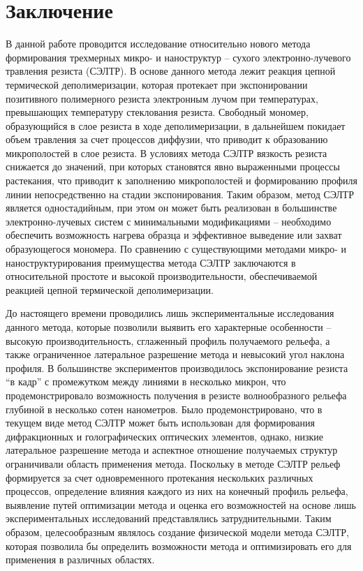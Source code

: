 \chapter*{Заключение}

В данной работе проводится исследование относительно нового метода формирования трехмерных микро- и наноструктур -- сухого электронно-лучевого травления резиста (СЭЛТР).
В основе данного метода лежит реакция цепной термической деполимеризации, которая протекает при экспонировании позитивного полимерного резиста электронным лучом при температурах, превышающих температуру стеклования резиста.
Свободный мономер, образующийся в слое резиста в ходе деполимеризации, в дальнейшем покидает объем травления за счет процессов диффузии, что приводит к образованию микрополостей в слое резиста.
В условиях метода СЭЛТР вязкость резиста снижается до значений, при которых становятся явно выраженными процессы растекания, что приводит к заполнению микрополостей и формированию профиля линии непосредственно на стадии экспонирования.
Таким образом, метод СЭЛТР является одностадийным, при этом он может быть реализован в большинстве электронно-лучевых систем с минимальными модификациями -- необходимо обеспечить возможность нагрева образца и эффективное выведение или захват образующегося мономера.
По сравнению с существующими методами микро- и наноструктурирования преимущества метода СЭЛТР заключаются в относительной простоте и высокой производительности, обеспечиваемой реакцией цепной термической деполимеризации.

До настоящего времени проводились лишь экспериментальные исследования данного метода, которые позволили выявить его характерные особенности -- высокую производительность, сглаженный профиль получаемого рельефа, а также ограниченное латеральное разрешение метода и невысокий угол наклона профиля.
В большинстве экспериментов производилось экспонирование резиста ``в кадр'' с промежутком между линиями в несколько микрон, что продемонстрировало возможность получения в резисте волнообразного рельефа глубиной в несколько сотен нанометров.
Было продемонстрировано, что в текущем виде метод СЭЛТР может быть использован для формирования дифракционных и голографических оптических элементов, однако, низкие латеральное разрешение метода и аспектное отношение получаемых структур ограничивали область применения метода.
Поскольку в методе СЭЛТР рельеф формируется за счет одновременного протекания нескольких различных процессов, определение влияния каждого из них на конечный профиль рельефа, выявление путей оптимизации метода и оценка его возможностей на основе лишь экспериментальных исследований представлялись затруднительными.
Таким образом, целесообразным являлось создание физической модели метода СЭЛТР, которая позволила бы определить возможности метода и оптимизировать его для применения в различных областях.


